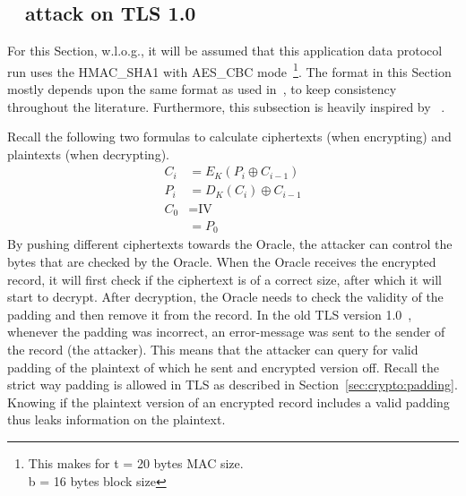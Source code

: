 \documentclass[10pt,conference,a4paper]{IEEEtran}
\begin{document}
\subsection{~\citeauthor{vaudenay2002security} attack on TLS 1.0}
\label{sec:paddingoracle:padding}
For this Section, w.l.o.g., it will be assumed that this application data protocol run uses the HMAC\_SHA1 with AES\_CBC mode~\footnote{This makes for t = 20 bytes MAC size. \\ b = 16 bytes block size}. The format in this Section mostly depends upon the same format as used in~\cite{alfardan2013lucky}, to keep consistency throughout the literature. Furthermore, this subsection is heavily inspired by ~\cite{alfardan2013lucky,vaudenay2002security}.

Recall the following two formulas to calculate ciphertexts (when  encrypting) and plaintexts (when decrypting).
\[
\begin{split}
C_i &= E_K(P_i \oplus C_{i-1}) \\
P_i &= D_K(C_i) \oplus C_{i-1} \\
C_0 &= \text{IV} \\
&= P_0
\end{split}
\]
By pushing different ciphertexts towards the Oracle, the attacker can control the bytes that are checked by the Oracle. When the Oracle receives the encrypted record, it will first check if the ciphertext is of a correct size, after which it will start to decrypt. After decryption, the Oracle needs to check the validity of the padding and then remove it from the record. In the old TLS version 1.0~\cite{dierks1999rfc}, whenever the padding was incorrect, an error-message was sent to the sender of the record (the attacker). This means that the attacker can query for valid padding of the plaintext of which he sent and encrypted version off. Recall the strict way padding is allowed in TLS as described in Section~\ref{sec:crypto:padding}. Knowing if the plaintext version of an encrypted record includes a valid padding thus leaks information on the plaintext.
\end{document}
